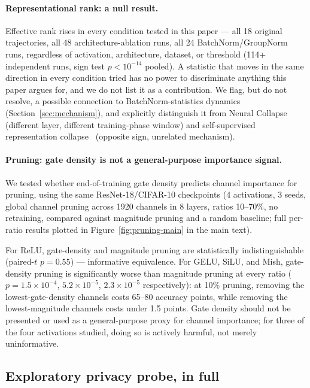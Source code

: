 \paragraph{Representational rank: a null result.} Effective rank rises in
every condition tested in this paper --- all 18 original trajectories, all
48 architecture-ablation runs, all 24 BatchNorm/GroupNorm runs, regardless
of activation, architecture, dataset, or threshold (114+ independent runs,
sign test $p<10^{-14}$ pooled). A statistic that moves in the same
direction in every condition tried has no power to discriminate anything
this paper argues for, and we do not list it as a contribution. We flag,
but do not resolve, a possible connection to BatchNorm-statistics dynamics
(Section~\ref{sec:mechanism}), and explicitly distinguish it from Neural
Collapse~\citep{papyan2020prevalence} (different layer, different
training-phase window) and self-supervised representation
collapse~\citep{hua2021feature,jing2022understanding} (opposite sign,
unrelated mechanism).

\paragraph{Pruning: gate density is not a general-purpose importance
signal.} We tested whether end-of-training gate density predicts channel
importance for pruning, using the same ResNet-18/CIFAR-10 checkpoints (4
activations, 3 seeds, global channel pruning across 1920 channels in 8
layers, ratios 10--70\%, no retraining, compared against magnitude pruning
and a random baseline; full per-ratio results plotted in
Figure~\ref{fig:pruning-main} in the main text).

For ReLU, gate-density and magnitude pruning are statistically
indistinguishable (paired-$t$ $p=0.55$) --- informative equivalence. For
GELU, SiLU, and Mish, gate-density pruning is significantly worse than
magnitude pruning at every ratio ($p=1.5\times10^{-4}$,
$5.2\times10^{-5}$, $2.3\times10^{-5}$ respectively): at 10\% pruning,
removing the lowest-gate-density channels costs 65--80 accuracy points,
while removing the lowest-magnitude channels costs under 1.5 points. Gate
density should not be presented or used as a general-purpose proxy for
channel importance; for three of the four activations studied, doing so is
actively harmful, not merely uninformative.

\subsection{Exploratory privacy probe, in full}
\label{sec:privacy}
\label{app:privacy}

